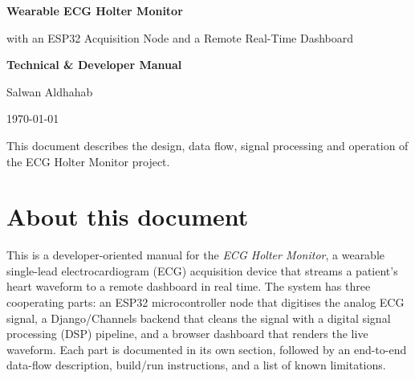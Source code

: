 \documentclass[11pt,a4paper]{article}
\begin{document}
\begin{titlepage}
  \centering
  \vspace*{2.5cm}
  {\Huge\bfseries Wearable ECG Holter Monitor\par}
  \vspace{0.6cm}
  {\Large with an ESP32 Acquisition Node and a Remote Real-Time Dashboard\par}
  \vspace{1.4cm}
  \vspace{1.6cm}

  {\large\textbf{Technical \& Developer Manual}\par}
  \vspace{2.0cm}
  {\large Salwan Aldhahab\par}
  \vspace{0.4cm}
  {\large\today\par}
  \vfill
  {\small This document describes the design, data flow, signal processing and
  operation of the ECG Holter Monitor project.\par}
\end{titlepage}

\tableofcontents
\thispagestyle{fancy}
\clearpage

\section*{About this document}
This is a developer-oriented manual for the \emph{ECG Holter Monitor}, a wearable
single-lead electrocardiogram (ECG) acquisition device that streams a patient's
heart waveform to a remote dashboard in real time. The system has three
cooperating parts: an ESP32 microcontroller node that digitises the analog ECG
signal, a Django/Channels backend that cleans the signal with a digital signal
processing (DSP) pipeline, and a browser dashboard that renders the live waveform.
Each part is documented in its own section, followed by an end-to-end data-flow
description, build/run instructions, and a list of known limitations.
\clearpage
\end{document}
